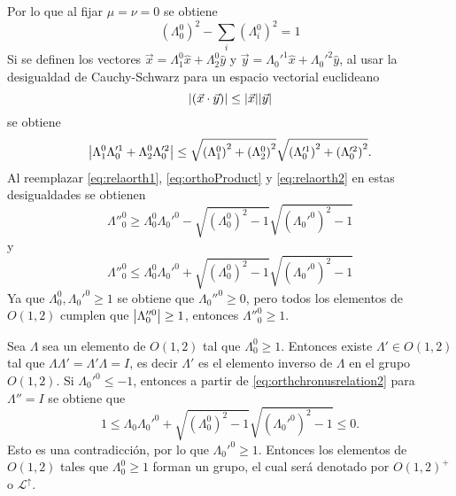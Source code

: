 Por lo que al fijar $\mu=\nu=0$ se obtiene
\begin{equation}
	(\Lambda_0^0)^2 - \sum_i(\Lambda_i^0)^2 = 1\label{eq:relaorth2}
\end{equation}
Si se definen los vectores $\vec{x} = \Lambda_1^0 \hat{x} + \Lambda_2^0 \hat{y}$ y $\vec{y} = \Lambda_0'^1 \hat{x} + \Lambda_0'^2 \hat{y}$, al usar la desigualdad de Cauchy-Schwarz para un espacio vectorial euclideano
\begin{equation}
	\abs{\left(\vec{x}\cdot \vec{y}\right)} \leq \abs{\vec{x}}\abs{\vec{y}}
\end{equation}
se obtiene
\begin{equation}
	\abs{\Lambda_1^0 \Lambda_0'^1 + \Lambda_2^0 \Lambda_0'^2} \leq \sqrt{\left(\Lambda_1^0\right)^2 + \left(\Lambda_2^0\right)^2} \sqrt{\left(\Lambda_0'^1\right)^2 + \left(\Lambda_0'^2\right)^2}.
\end{equation}
Al reemplazar \eqref{eq:relaorth1}, \eqref{eq:orthoProduct} y \eqref{eq:relaorth2}  en estas desigualdades se obtienen
\begin{equation}
	\Lambda''^0_0 \geq \Lambda_0^0\Lambda_0'^0 - \sqrt{\left(\Lambda_0^0\right)^2 -1} \sqrt{\left(\Lambda_0'^0\right)^2 -1}\label{eq:orthchronusrelation1}
\end{equation}
y
\begin{equation}
	\Lambda''^0_0 \leq \Lambda_0^0\Lambda_0'^0 + \sqrt{\left(\Lambda_0^0\right)^2 -1} \sqrt{\left(\Lambda_0'^0\right)^2 -1}\label{eq:orthchronusrelation2}
\end{equation}
Ya que $\Lambda_0^0,\Lambda_0'^0 \geq 1$ se obtiene que $\Lambda_0''^0 \geq 0$, pero todos los elementos de $O(1,2)$ cumplen que $\abs{\Lambda_0''^0} \geq 1$, entonces $\Lambda''^0_0 \geq 1$.

Sea $\Lambda$ sea un elemento de $O(1,2)$ tal que $\Lambda_0^0 \geq 1$. Entonces existe $\Lambda' \in O(1,2)$ tal que  $\Lambda\Lambda' = \Lambda'\Lambda= I$, es decir $\Lambda'$ es el elemento inverso de $\Lambda$ en el grupo $O(1,2)$. Si $\Lambda_0'^0\leq -1$, entonces a partir de \eqref{eq:orthchronusrelation2} para $\Lambda'' = I$ se obtiene que
\begin{equation}
	1 \leq \Lambda_0\Lambda_0'^0 + \sqrt{\left(\Lambda_0^0\right)^2 -1} \sqrt{\left(\Lambda_0'^0\right)^2 -1}\leq 0.
\end{equation}
Esto es una contradicción, por lo que $\Lambda_0'^0 \geq 1$. Entonces los elementos de $O(1,2)$ tales que $\Lambda_0^0 \geq 1$ forman un grupo, el cual será denotado por $O(1,2)^+$ o $\mathcal{L}^{\uparrow}$.

